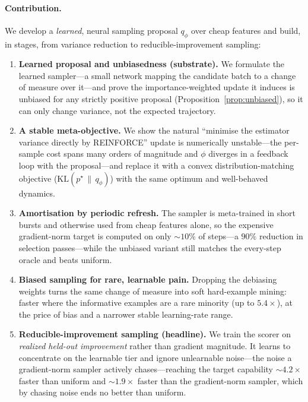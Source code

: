 \documentclass[11pt]{article}
\begin{document}
\paragraph{Contribution.} We develop a \emph{learned}, neural sampling proposal
$q_\phi$ over cheap features and build, in stages, from variance reduction to
reducible-improvement sampling:
\begin{enumerate}
\item \textbf{Learned proposal and unbiasedness (substrate).} We formulate the
learned sampler---a small network mapping the candidate batch to a change of
measure over it---and prove the importance-weighted update it induces is unbiased
for any strictly positive proposal (Proposition~\ref{prop:unbiased}), so it can
only change variance, not the expected trajectory.
\item \textbf{A stable meta-objective.} We show the natural ``minimise the
estimator variance directly by REINFORCE'' update is numerically unstable---the
per-sample cost spans many orders of magnitude and $\phi$ diverges in a feedback
loop with the proposal---and replace it with a convex distribution-matching
objective ($\mathrm{KL}(p^\star \,\|\, q_\phi)$) with the same optimum and
well-behaved dynamics.
\item \textbf{Amortisation by periodic refresh.} The sampler is meta-trained
in short bursts and otherwise used from cheap features alone, so the expensive
gradient-norm target is computed on only $\sim\!10\%$ of steps---a $90\%$
reduction in selection passes---while the unbiased variant still matches the
every-step oracle and beats uniform.
\item \textbf{Biased sampling for rare, learnable pain.} Dropping the debiasing
weights turns the same change of measure into soft hard-example mining: faster
where the informative examples are a rare minority (up to $5.4\times$), at the
price of bias and a narrower stable learning-rate range.
\item \textbf{Reducible-improvement sampling (headline).} We train the scorer on
\emph{realized held-out improvement} rather than gradient magnitude. It learns to
concentrate on the learnable tier and ignore unlearnable noise---the noise a
gradient-norm sampler actively chases---reaching the target capability
$\sim\!4.2\times$ faster than uniform and $\sim\!1.9\times$ faster than the
gradient-norm sampler, which by chasing noise ends no better than uniform.
\end{enumerate}
\end{document}
